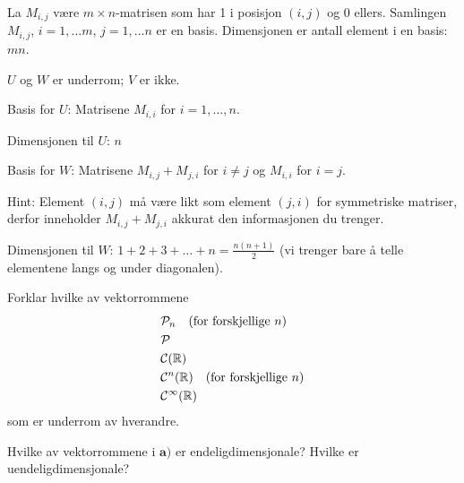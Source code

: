 \begin{losning}
\begin{punkt}
La $M_{i,j}$ være $m\times n$-matrisen som har 1 i posisjon $(i,j)$ og 0 ellers. Samlingen $M_{i,j}$, $i=1,\dots m$, $j=1,\dots n$ er en basis. Dimensjonen er antall element i en basis: $mn$.
\end{punkt}

\begin{punkt}
$U$ og $W$ er underrom; $V$ er ikke.
\end{punkt}

\begin{punkt}
\noindent
Basis for $U$: Matrisene $M_{i,i}$ for $i=1,\dots,n$.

\noindent
Dimensjonen til $U$: $n$

\noindent
Basis for $W$: Matrisene $M_{i,j}+M_{j,i}$ for $i\neq j$ og $M_{i,i}$ for $i=j$.

\noindent
Hint: Element $(i,j)$ må være likt som element $(j,i)$ for symmetriske matriser, derfor inneholder $M_{i,j}+M_{j,i}$ akkurat den informasjonen du trenger.


\noindent 
Dimensjonen til $W$: $1+2+3+\dots +n=\frac{n(n+1)}{2}$ (vi trenger bare å telle elementene langs og under diagonalen).
\end{punkt}


\end{losning}



\begin{oppgave}

\begin{punkt}
Forklar hvilke av vektorrommene
\begin{align*}
& \mathcal{P}_n \quad \text{(for forskjellige~$n$)} \\
& \mathcal{P} \\
& \mathcal{C}(\mathbb{R}) \\
& \mathcal{C}^n(\mathbb{R}) \quad \text{(for forskjellige~$n$)} \\
& \mathcal{C}^\infty(\mathbb{R})
\end{align*}
som er underrom av hverandre.
\end{punkt}

\begin{punkt}
Hvilke av vektorrommene i $\textbf{a)}$ er endeligdimensjonale?
Hvilke er uendeligdimensjonale?
\end{punkt}


\end{oppgave}


